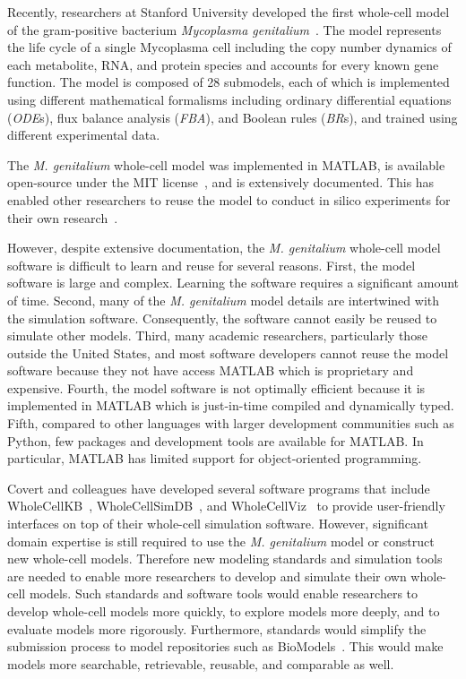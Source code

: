 \documentclass[journal,transmag]{IEEEtran}
\begin{document}
Recently, researchers at Stanford University developed the first whole-cell model of the gram-positive bacterium \textit{Mycoplasma genitalium}~\cite{Karr2012}. The model represents the life cycle of a single Mycoplasma cell including the copy number dynamics of each metabolite, RNA, and protein species and accounts for every known gene function. The model is composed of 28 submodels, each of which is implemented using different mathematical formalisms including ordinary differential equations (\emph{ODE}s), flux balance analysis (\emph{FBA}), and Boolean rules (\emph{BR}s), and trained using different experimental data.

The \textit{M. genitalium} whole-cell model was implemented in MATLAB, is available open-source under the MIT license~\cite{wholeCell}, and is extensively documented. This has enabled other researchers to reuse the model to conduct in silico experiments for their own research~\cite{Sanghvi2013, Purcell2013, Kazakiewicz2015}. 

However, despite extensive documentation, the \textit{M. genitalium} whole-cell model software is difficult to learn and reuse for several reasons. First, the model software is large and complex. Learning the software requires a significant amount of time. Second, many of the \textit{M. genitalium} model details are intertwined with the simulation software. Consequently, the software cannot easily be reused to simulate other models. Third, many academic researchers, particularly those outside the United States, and most software developers cannot reuse the model software because they not have access MATLAB which is proprietary and expensive. Fourth, the model software is not optimally efficient because it is implemented in MATLAB which is just-in-time compiled and dynamically typed. Fifth, compared to other languages with larger development communities such as Python, few packages and development tools are available for MATLAB. In particular, MATLAB has limited support for object-oriented programming.

Covert and colleagues have developed several software programs that include WholeCellKB~\cite{Karr2013}, WholeCellSimDB~\cite{Karr2014}, and WholeCellViz~\cite{Lee2013} to provide user-friendly interfaces on top of their whole-cell simulation software. However, significant domain expertise is still required to use the \textit{M. genitalium} model or construct new whole-cell models. Therefore new modeling standards and simulation tools are needed to enable more researchers to develop and simulate their own whole-cell models. Such standards and software tools would enable researchers to develop whole-cell models more quickly, to explore models more deeply, and to evaluate models more rigorously. Furthermore, standards would simplify the submission process to model repositories such as BioModels~\cite{juty2015biomodels,chelliah2015biomodels}. This would make models more searchable, retrievable, reusable, and comparable as well.
\end{document}
